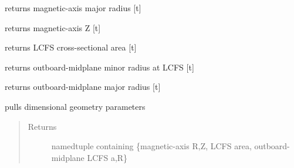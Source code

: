 \documentclass[letterpaper,10pt,english]{sphinxmanual}
\begin{document}
\begin{fulllineitems}
\begin{fulllineitems}
\end{fulllineitems}


\begin{fulllineitems}
\label{eqtools:eqtools.EFIT.EFITTree.getMagR}
returns magnetic-axis major radius {[}t{]}

\end{fulllineitems}


\begin{fulllineitems}
\label{eqtools:eqtools.EFIT.EFITTree.getMagZ}
returns magnetic-axis Z {[}t{]}

\end{fulllineitems}


\begin{fulllineitems}
\label{eqtools:eqtools.EFIT.EFITTree.getAreaLCFS}
returns LCFS cross-sectional area {[}t{]}

\end{fulllineitems}


\begin{fulllineitems}
\label{eqtools:eqtools.EFIT.EFITTree.getAOut}
returns outboard-midplane minor radius at LCFS {[}t{]}

\end{fulllineitems}


\begin{fulllineitems}
\label{eqtools:eqtools.EFIT.EFITTree.getRmidOut}
returns outboard-midplane major radius {[}t{]}

\end{fulllineitems}


\begin{fulllineitems}
\label{eqtools:eqtools.EFIT.EFITTree.getGeometry}
pulls dimensional geometry parameters
\begin{quote}\begin{description}
\item[{Returns}] \leavevmode
namedtuple containing \{magnetic-axis R,Z, LCFS area, outboard-midplane LCFS a,R\}


\end{description}
\end{quote}
\end{fulllineitems}
\end{fulllineitems}
\end{document}
